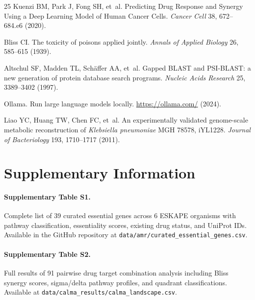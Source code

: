 \documentclass[12pt,a4paper]{article}
\begin{document}
\begin{thebibliography}{25}
Kuenzi BM, Park J, Fong SH, et~al.
\newblock Predicting Drug Response and Synergy Using a Deep Learning Model of Human Cancer Cells.
\newblock \textit{Cancer Cell} 38, 672--684.e6 (2020).

Bliss CI.
\newblock The toxicity of poisons applied jointly.
\newblock \textit{Annals of Applied Biology} 26, 585--615 (1939).

Altschul SF, Madden TL, Sch\"affer AA, et~al.
\newblock Gapped BLAST and PSI-BLAST: a new generation of protein database search programs.
\newblock \textit{Nucleic Acids Research} 25, 3389--3402 (1997).

Ollama.
\newblock Run large language models locally.
\newblock \url{https://ollama.com/} (2024).

Liao YC, Huang TW, Chen FC, et~al.
\newblock An experimentally validated genome-scale metabolic reconstruction of \textit{Klebsiella pneumoniae} MGH 78578, iYL1228.
\newblock \textit{Journal of Bacteriology} 193, 1710--1717 (2011).

\end{thebibliography}


\clearpage
\appendix
\section*{Supplementary Information}

\paragraph{Supplementary Table S1.} Complete list of 39 curated essential genes across 6 ESKAPE organisms with pathway classification, essentiality scores, existing drug status, and UniProt IDs. Available in the GitHub repository at \texttt{data/amr/curated\_essential\_genes.csv}.

\paragraph{Supplementary Table S2.} Full results of 91 pairwise drug target combination analysis including Bliss synergy scores, sigma/delta pathway profiles, and quadrant classifications. Available at \texttt{data/calma\_results/calma\_landscape.csv}.
\end{document}
